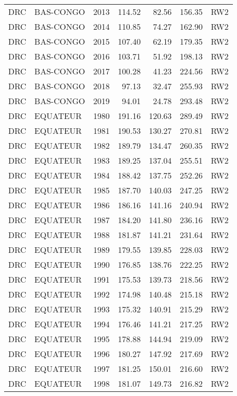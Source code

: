 \begin{longtable}{lllrrrl}
  DRC & BAS-CONGO & 2013 & 114.52 & 82.56 & 156.35 & RW2 \\ 
  DRC & BAS-CONGO & 2014 & 110.85 & 74.27 & 162.90 & RW2 \\ 
  DRC & BAS-CONGO & 2015 & 107.40 & 62.19 & 179.35 & RW2 \\ 
  DRC & BAS-CONGO & 2016 & 103.71 & 51.92 & 198.13 & RW2 \\ 
  DRC & BAS-CONGO & 2017 & 100.28 & 41.23 & 224.56 & RW2 \\ 
  DRC & BAS-CONGO & 2018 & 97.13 & 32.47 & 255.93 & RW2 \\ 
  DRC & BAS-CONGO & 2019 & 94.01 & 24.78 & 293.48 & RW2 \\ 
  DRC & EQUATEUR & 1980 & 191.16 & 120.63 & 289.49 & RW2 \\ 
  DRC & EQUATEUR & 1981 & 190.53 & 130.27 & 270.81 & RW2 \\ 
  DRC & EQUATEUR & 1982 & 189.79 & 134.47 & 260.35 & RW2 \\ 
  DRC & EQUATEUR & 1983 & 189.25 & 137.04 & 255.51 & RW2 \\ 
  DRC & EQUATEUR & 1984 & 188.42 & 137.75 & 252.26 & RW2 \\ 
  DRC & EQUATEUR & 1985 & 187.70 & 140.03 & 247.25 & RW2 \\ 
  DRC & EQUATEUR & 1986 & 186.16 & 141.16 & 240.94 & RW2 \\ 
  DRC & EQUATEUR & 1987 & 184.20 & 141.80 & 236.16 & RW2 \\ 
  DRC & EQUATEUR & 1988 & 181.87 & 141.21 & 231.64 & RW2 \\ 
  DRC & EQUATEUR & 1989 & 179.55 & 139.85 & 228.03 & RW2 \\ 
  DRC & EQUATEUR & 1990 & 176.85 & 138.76 & 222.25 & RW2 \\ 
  DRC & EQUATEUR & 1991 & 175.53 & 139.73 & 218.56 & RW2 \\ 
  DRC & EQUATEUR & 1992 & 174.98 & 140.48 & 215.18 & RW2 \\ 
  DRC & EQUATEUR & 1993 & 175.32 & 140.91 & 215.29 & RW2 \\ 
  DRC & EQUATEUR & 1994 & 176.46 & 141.21 & 217.25 & RW2 \\ 
  DRC & EQUATEUR & 1995 & 178.88 & 144.94 & 219.09 & RW2 \\ 
  DRC & EQUATEUR & 1996 & 180.27 & 147.92 & 217.69 & RW2 \\ 
  DRC & EQUATEUR & 1997 & 181.25 & 150.01 & 216.60 & RW2 \\ 
  DRC & EQUATEUR & 1998 & 181.07 & 149.73 & 216.82 & RW2 \\ 

\end{longtable}
